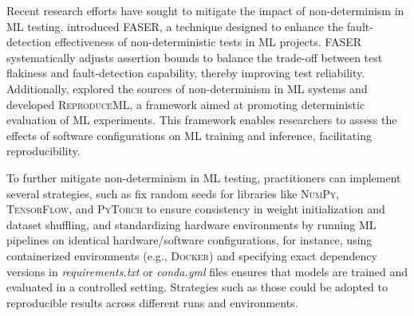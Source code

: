 Recent research efforts have sought to mitigate the impact of non-determinism in ML testing. \cite{xia2023balancing} introduced FASER, a technique designed to enhance the fault-detection effectiveness of non-deterministic tests in ML projects. \textsc{FASER} systematically adjusts assertion bounds to balance the trade-off between test flakiness and fault-detection capability, thereby improving test reliability.
Additionally, \cite{rivera2021challenge} explored the sources of non-determinism in ML systems and developed \textsc{ReproduceML}, a framework aimed at promoting deterministic evaluation of ML experiments. This framework enables researchers to assess the effects of software configurations on ML training and inference, facilitating reproducibility.

To further mitigate non-determinism in ML testing, practitioners can implement several strategies, such as
fix random seeds for libraries like \textsc{NumPy}, \textsc{TensorFlow}, and \textsc{PyTorch} to ensure consistency in weight initialization and dataset shuffling, and standardizing hardware environments by running ML pipelines on identical hardware/software configurations, for instance, using containerized environments (e.g., \textsc{Docker}) and specifying exact dependency versions in \textit{requirements.txt} or \textit{conda.yml} files ensures that models are trained and evaluated in a controlled setting.
Strategies such as those could be adopted to reproducible results across different runs and environments.




